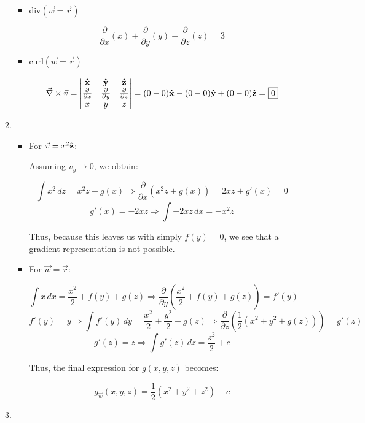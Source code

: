 \begin{enumerate}
\begin{enumerate}
\begin{itemize}
          \item div$(\vec{w}=\vec{r})$

            $$\boxed{\frac{\partial}{\partial x}(x)+\frac{\partial}{\partial y}(y)+\frac{\partial}{\partial z}(z)=3}$$

          \item curl$(\vec{w}=\vec{r})$

            $$\vec{\nabla}\times\vec{v}=\left|\begin{matrix}\bold{\hat{x}} & \bold{\hat{y}} & \bold{\hat{z}}\\ \frac{\partial}{\partial x} & \frac{\partial}{\partial y} & \frac{\partial}{\partial z}\\ x & y & z\end{matrix}\right|=(0-0)\bold{\hat{x}}-(0-0)\bold{\hat{y}}+(0-0)\bold{\hat{z}}=\boxed{0}$$

        \end{itemize}

      \item 

        \begin{itemize}

          \item For $\vec{v}=x^2\bold{\hat{z}}$:

            Assuming $v_y\rightarrow 0$, we obtain:

            $$\int x^2\,dz=x^2z+g(x)\Rightarrow \frac{\partial}{\partial x}(x^2z+g(x))=2xz+g'(x)=0$$
            $$g'(x)=-2xz\Rightarrow \int-2xz\,dx=-x^2z$$

            Thus, because this leaves us with simply $f(y)=0$, we see that a gradient representation is not possible.

          \item For $\vec{w}=\vec{r}$:

            $$\int x\,dx=\frac{x^2}{2}+f(y)+g(z)\Rightarrow \frac{\partial}{\partial y}\left( \frac{x^2}{2}+f(y)+g(z) \right)=f'(y)$$
            $$f'(y)=y\Rightarrow \int f'(y)\,dy=\frac{x^2}{2}+\frac{y^2}{2}+g(z)\Rightarrow\frac{\partial}{\partial z}\left(\frac{1}{2}\left( x^2+y^2+g(z) \right)\right)=g'(z)$$
            $$g'(z)=z\Rightarrow \int g'(z)\,dz=\frac{z^2}{2}+c$$

            Thus, the final expression for $g(x,y,z)$ becomes:

            $$\boxed{g_{\vec{w}}(x,y,z)=\frac{1}{2}\left( x^2+y^2+z^2 \right) + c}$$

        \end{itemize}

      \item 

    \end{enumerate}

\end{enumerate}



